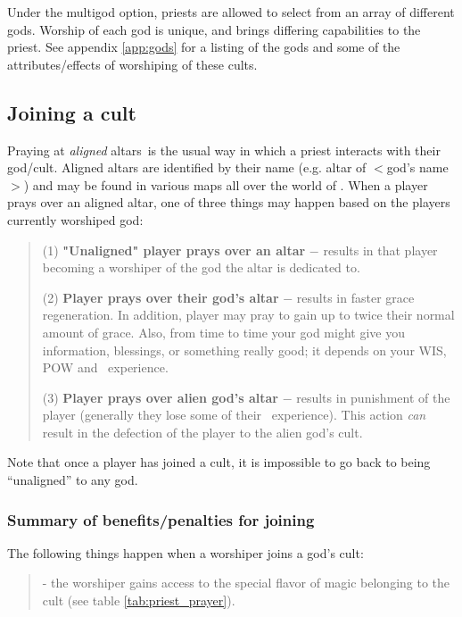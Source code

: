 {{{Under the multigod option, priests are allowed
to select from an array of different gods. Worship of each god is unique, 
and brings differing capabilities to the priest. 
See appendix \ref{app:gods} for a listing of the gods and some of the 
attributes/effects of worshiping of these cults.


\subsection{Joining a cult}

Praying at {\em aligned} altars\ is the usual way 
in which a priest interacts
with their god/cult. Aligned altars are identified by their name (e.g. 
altar of $<$god's name$>$) and may be found in various maps all over the 
world of \cf .
When a player prays over an aligned altar, one of three things may happen based
on the players currently worshiped god:
\begin{quote}

        (1) {\bf "Unaligned" player prays over an altar} $-$ 
	results in that player
        becoming a worshiper of the god the altar is dedicated to.

        (2) {\bf Player prays over their god's altar} $-$ 
	results in faster grace
        regeneration. In addition, player may pray to gain up to twice their
        normal amount of grace. Also, from time to time your god might
	give you information, blessings, or something really good; it depends
	on your WIS, POW and \priest\ experience.

        (3) {\bf Player prays over alien god's altar} $-$ 
	results in punishment
        of the player (generally they lose some of their \priest\ experience). 
	This action {\em can} result in the defection of the player to the alien 
	god's cult.
\end{quote}
Note that once a player has joined a cult, it is impossible to go back
to being ``unaligned'' to any god.


\subsubsection{Summary of benefits/penalties for joining}

The following things happen when a worshiper joins a god's cult:
\begin{quote}

- the worshiper gains access to the special flavor of magic belonging
to the cult (see table \ref{tab:priest_prayer}).


\end{quote}}}}
